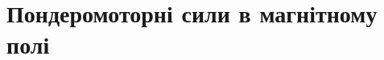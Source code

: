 \documentclass[onlytextwidth]{beamer}
\begin{document}



\section{Пондеромоторні сили в магнітному полі}
\end{document}
